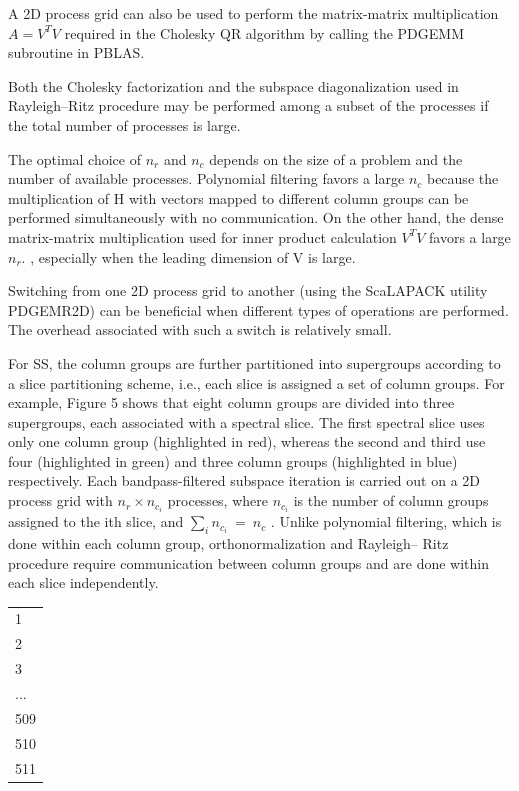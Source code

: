 \documentclass[
  10
]{article}
\newcounter{none} %
\begin{document}
A 2D process grid can also be used to perform the matrix-matrix
multiplication \(A = V ^ { T } V\) required in the Cholesky QR algorithm
by calling the PDGEMM subroutine in PBLAS.

Both the Cholesky factorization and the subspace diagonalization used in
Rayleigh--Ritz procedure may be performed among a subset of the
processes if the total number of processes is large.

The optimal choice of \(n _ { r }\) and \(n _ { c }\) depends on the
size of a problem and the number of available processes. Polynomial
filtering favors a large \(n _ { c }\) because the multiplication of H
with vectors mapped to different column groups can be performed
simultaneously with no communication. On the other hand, the dense
matrix-matrix multiplication used for inner product calculation
\(V ^ { T } V\) favors a large \(n _ { r } .\) , especially when the
leading dimension of V is large.

Switching from one 2D process grid to another (using the ScaLAPACK
utility PDGEMR2D) can be beneficial when different types of operations
are performed. The overhead associated with such a switch is relatively
small.

For SS, the column groups are further partitioned into supergroups
according to a slice partitioning scheme, i.e., each slice is assigned a
set of column groups. For example, Figure 5 shows that eight column
groups are divided into three supergroups, each associated with a
spectral slice. The first spectral slice uses only one column group
(highlighted in red), whereas the second and third use four (highlighted
in green) and three column groups (highlighted in blue) respectively.
Each bandpass-filtered subspace iteration is carried out on a 2D process
grid with \(n _ { r } \times n _ { c _ { i } }\) processes, where
\(n _ { c _ { i } }\) is the number of column groups assigned to the ith
slice, and \(\textstyle \sum _ { i } n _ { c _ { i } } \ = \ n _ { c }\)
. Unlike polynomial filtering, which is done within each column group,
orthonormalization and Rayleigh-- Ritz procedure require communication
between column groups and are done within each slice independently.

{\def\LTcaptype{none} %
\begin{longtable}[]{@{}|l|@{}}
\toprule\noalign{}
\endhead
\bottomrule\noalign{}
\endlastfoot
\hline
0 \\
\hline
1 \\
\hline
2 \\
\hline
3 \\
\hline
... \\
\hline
509 \\
\hline
510 \\
\hline
511 \\
\hline
\end{longtable}
}
\end{document}
